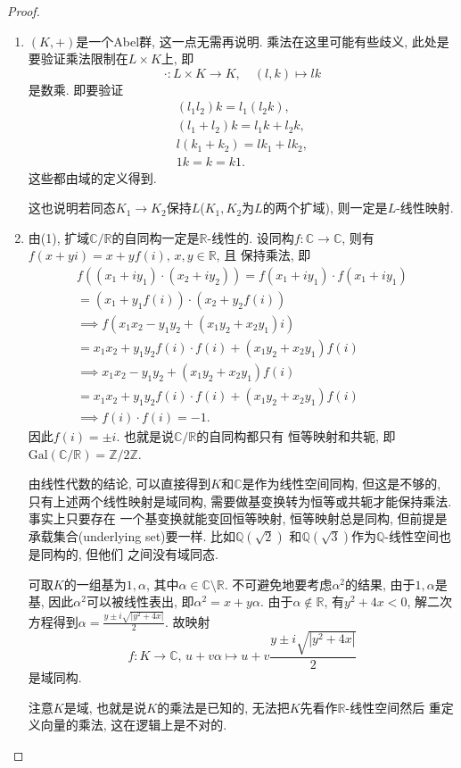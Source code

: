 \documentclass{../solutions-cn}
\begin{document}
\begin{proof}
\begin{enumerate}[(1)]
    \item $(K, +)$是一个Abel群, 这一点无需再说明. 乘法在这里可能有些歧义,
    此处是要验证乘法限制在$L \times K$上, 即
    \[
        \cdot: L \times K \to K, \quad (l, k) \mapsto lk
    \]
    是数乘. 即要验证
    \[
    \begin{gathered}
        (l_1l_2)k = l_1(l_2k),\\
        (l_1 + l_2)k = l_1k + l_2k,\\
        l(k_1 + k_2) = lk_1 + lk_2,\\
        1k = k = k1.
    \end{gathered}
    \]
    这些都由域的定义得到.

    这也说明若同态$K_1 \to K_2$保持$L$($K_1, K_2$为$L$的两个扩域),
    则一定是$L$-线性映射.
    \item 由(1), 扩域$\mathbb{C}/\mathbb{R}$的自同构一定是$\mathbb{R}$-线性的.
    设同构$f: \mathbb{C} \to \mathbb{C}$, 则有
    $f(x + yi) = x + yf(i),\, x, y \in \mathbb{R}$, 且
    保持乘法, 即
    \[
    \begin{gathered}
        f\left((x_1 + iy_1) \cdot (x_2 + iy_2)\right) = f(x_1 + iy_1) \cdot f(x_1 + iy_1) \\= (x_1 + y_1f(i)) \cdot (x_2 + y_2f(i))\\
        \implies f\left(x_1x_2 - y_1y_2 + (x_1y_2 +x_2y_1)i\right) \\= x_1x_2 + y_1y_2f(i) \cdot f(i) + (x_1y_2 +x_2y_1)f(i)\\
        \implies x_1x_2 - y_1y_2 + (x_1y_2 +x_2y_1)f(i) \\= x_1x_2 + y_1y_2f(i) \cdot f(i) + (x_1y_2 +x_2y_1)f(i)\\
        \implies f(i) \cdot f(i) = -1.
    \end{gathered} 
    \]
    因此$f(i) = \pm i$. 也就是说$\mathbb{C}/\mathbb{R}$的自同构都只有
    恒等映射和共轭, 即$\mathrm{Gal}(\mathbb{C}/\mathbb{R}) = \mathbb{Z}/2\mathbb{Z}$.

    由线性代数的结论, 可以直接得到$K$和$\mathbb{C}$是作为线性空间同构, 但这是不够的,
    只有上述两个线性映射是域同构, 需要做基变换转为恒等或共轭才能保持乘法. 事实上只要存在
    一个基变换就能变回恒等映射, 恒等映射总是同构,
    但前提是承载集合(underlying set)要一样. 比如$\mathbb{Q}(\sqrt{2})$
    和$\mathbb{Q}(\sqrt{3})$作为$\mathbb{Q}$-线性空间也是同构的, 但他们
    之间没有域同态.

    可取$K$的一组基为$1, \alpha$, 其中$\alpha \in \mathbb{C} \setminus \mathbb{R}$.
    不可避免地要考虑$\alpha^2$的结果, 由于$1, \alpha$是基, 因此$\alpha^2$可以被线性表出,
    即$\alpha^2 = x + y\alpha$. 由于$\alpha \notin \mathbb{R}$, 有$y^2 + 4x < 0$,
    解二次方程得到$\alpha = \frac{y \pm i\sqrt{|y^2 + 4x|}}{2}$.
    故映射
\[
    f: K \to \mathbb{C},\, u + v\alpha \mapsto u + v\frac{y \pm i\sqrt{|y^2 + 4x|}}{2}
\]
    是域同构.

    注意$K$是域, 也就是说$K$的乘法是已知的, 无法把$K$先看作$\mathbb{R}$-线性空间然后
    重定义向量的乘法, 这在逻辑上是不对的.
\end{enumerate}
\end{proof}
\end{document}
